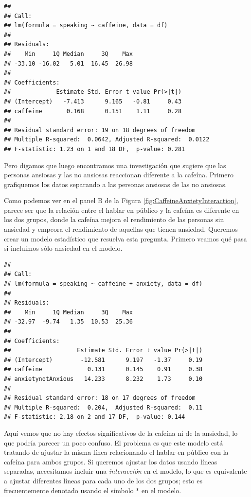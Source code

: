 \documentclass[
  12pt,
]{book}
\begin{document}
\begin{verbatim}
## 
## Call:
## lm(formula = speaking ~ caffeine, data = df)
## 
## Residuals:
##    Min     1Q Median     3Q    Max 
## -33.10 -16.02   5.01  16.45  26.98 
## 
## Coefficients:
##             Estimate Std. Error t value Pr(>|t|)
## (Intercept)   -7.413      9.165   -0.81     0.43
## caffeine       0.168      0.151    1.11     0.28
## 
## Residual standard error: 19 on 18 degrees of freedom
## Multiple R-squared:  0.0642, Adjusted R-squared:  0.0122 
## F-statistic: 1.23 on 1 and 18 DF,  p-value: 0.281
\end{verbatim}

Pero digamos que luego encontramos una investigación que sugiere que las personas ansiosas y las no ansiosas reaccionan diferente a la cafeína. Primero grafiquemos los datos separando a las personas ansiosas de las no ansiosas.

Como podemos ver en el panel B de la Figura \ref{fig:CaffeineAnxietyInteraction}, parece ser que la relación entre el hablar en público y la cafeína es diferente en los dos grupos, donde la cafeína mejora el rendimiento de las personas sin ansiedad y empeora el rendimiento de aquellas que tienen ansiedad. Queremos crear un modelo estadístico que resuelva esta pregunta. Primero veamos qué pasa si incluimos sólo ansiedad en el modelo.

\begin{verbatim}
## 
## Call:
## lm(formula = speaking ~ caffeine + anxiety, data = df)
## 
## Residuals:
##    Min     1Q Median     3Q    Max 
## -32.97  -9.74   1.35  10.53  25.36 
## 
## Coefficients:
##                   Estimate Std. Error t value Pr(>|t|)
## (Intercept)        -12.581      9.197   -1.37     0.19
## caffeine             0.131      0.145    0.91     0.38
## anxietynotAnxious   14.233      8.232    1.73     0.10
## 
## Residual standard error: 18 on 17 degrees of freedom
## Multiple R-squared:  0.204,  Adjusted R-squared:  0.11 
## F-statistic: 2.18 on 2 and 17 DF,  p-value: 0.144
\end{verbatim}

Aquí vemos que no hay efectos significativos de la cafeína ni de la ansiedad, lo que podría parecer un poco confuso. El problema es que este modelo está tratando de ajustar la misma línea relacionando el hablar en público con la cafeína para ambos grupos. Si queremos ajustar los datos usando líneas separadas, necesitamos incluir una \emph{interacción} en el modelo, lo que es equivalente a ajustar diferentes líneas para cada uno de los dos grupos; esto es frecuentemente denotado usando el símbolo \(*\) en el modelo.
\end{document}
